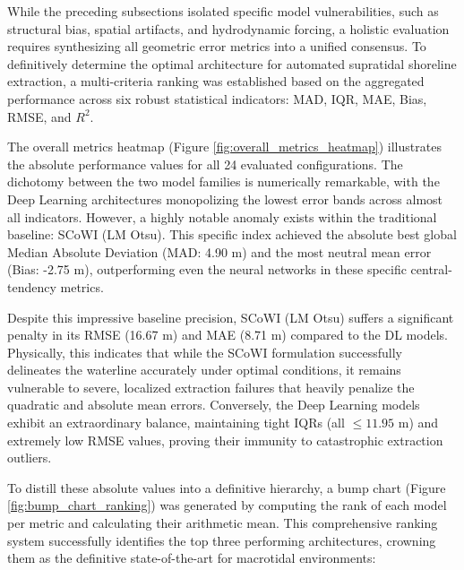 ﻿\documentclass[ENG]{TFUOC}%
\begin{document}
While the preceding subsections isolated specific model vulnerabilities, such as structural bias, spatial artifacts, and hydrodynamic forcing, a holistic evaluation requires synthesizing all geometric error metrics into a unified consensus. To definitively determine the optimal architecture for automated supratidal shoreline extraction, a multi-criteria ranking was established based on the aggregated performance across six robust statistical indicators: MAD, IQR, MAE, Bias, RMSE, and $R^2$.

The overall metrics heatmap (Figure \ref{fig:overall_metrics_heatmap}) illustrates the absolute performance values for all 24 evaluated configurations. The dichotomy between the two model families is numerically remarkable, with the Deep Learning architectures monopolizing the lowest error bands across almost all indicators. However, a highly notable anomaly exists within the traditional baseline: SCoWI (LM Otsu). This specific index achieved the absolute best global Median Absolute Deviation (MAD: 4.90 m) and the most neutral mean error (Bias: -2.75 m), outperforming even the neural networks in these specific central-tendency metrics. 

Despite this impressive baseline precision, SCoWI (LM Otsu) suffers a significant penalty in its RMSE (16.67 m) and MAE (8.71 m) compared to the DL models. Physically, this indicates that while the SCoWI formulation successfully delineates the waterline accurately under optimal conditions, it remains vulnerable to severe, localized extraction failures that heavily penalize the quadratic and absolute mean errors. Conversely, the Deep Learning models exhibit an extraordinary balance, maintaining tight IQRs (all $\le 11.95$ m) and extremely low RMSE values, proving their immunity to catastrophic extraction outliers.

To distill these absolute values into a definitive hierarchy, a bump chart (Figure \ref{fig:bump_chart_ranking}) was generated by computing the rank of each model per metric and calculating their arithmetic mean. This comprehensive ranking system successfully identifies the top three performing architectures, crowning them as the definitive state-of-the-art for macrotidal environments:
\end{document}

